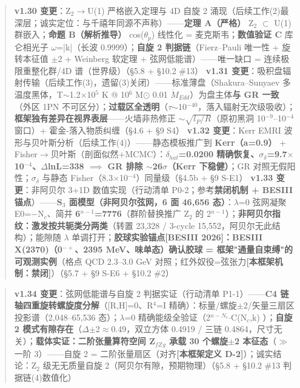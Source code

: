 \documentclass[UTF8,fontset=windows]{csoarticle}
\newcommand{\mtag}[1]{\textbf{[#1]}}
\newcommand{\up}[1]{\ensuremath{^{#1}}}
\newcommand{\down}[1]{\ensuremath{_{#1}}}
\begin{document}
\begin{quote}
\textbf{v1.30 变更}：Z\down{2}\ensuremath{\to}U(1) 严格嵌入定理与 4D 自旋 2 涌现（后续工作(2)最深层；诚实定位：与千禧年同源不声称）------\textbf{定理 A（严格）} Z\down{2} \ensuremath{\subset} U(1) 群嵌入；\textbf{命题 B（解析推导）} cos(\ensuremath{\theta}\down{p}) 线性化 = 麦克斯韦；\textbf{数值验证 C} 库仑相光子 \ensuremath{\omega}=|k|（长波 0.9999）；\textbf{自旋 2 判据链}（Fierz--Pauli 唯一性 + 旋转本征值 \ensuremath{\pm}2 + Weinberg 软定理 + 弦网低能谱）------唯一缺口 = 连续极限重整化群/4D 谱（世界级）（\S{}5.8 + \S{}10.2 \#13）
\textbf{v1.31 变更}：吸积盘辐射传输（后续工作(3)，遗留(3)关闭）------标准薄盘（Shakura--Sunyaev 多温度黑体，T\ensuremath{\sim}1.2\ensuremath{\times}10\up{5} K @ 10\up{6} M\ensuremath{\odot} 0.01 \ensuremath{\dot{M}}\down{Edd}）为盘主体\textbf{与 GR 一致}（外区 1PN 不可区分）；\textbf{过载区全透明}（\ensuremath{\tau}\ensuremath{\sim}10\up{-40}，落入辐射无次级吸收）；\textbf{框架独有差异在视界表层}------火墙非热修正 \ensuremath{\sim}\ensuremath{\sqrt{l\down{P}/R}}（原初黑洞 10\up{-9}--10\up{-4} 窗口）+ 霍金-落入物质纠缠（\S{}4.6 + \S{}9 S4）
\textbf{v1.32 变更}：Kerr EMRI 波形与贝叶斯分析（后续工作(4)）------静态模板推广到 \textbf{Kerr（a=0.9）} + Fisher\ensuremath{\to}贝叶斯（剖面似然+MCMC）：\textbf{\ensuremath{\delta}\down{hat}=0.0200 精确恢复、\ensuremath{\sigma}\down{\delta{}}=9.7\ensuremath{\times}10\up{-4}、\ensuremath{\Delta}lnL=338 \ensuremath{\implies} GR 排除 \ensuremath{\sim}26\ensuremath{\sigma}（Kerr 下稳健）}；GR 对照无假阳性；\ensuremath{\sigma}\down{\delta{}} 与静态 Fisher（8.3\ensuremath{\times}10\up{-4}）同量级（\S{}4.5b + \S{}9 S-E1）
\textbf{v1.33 变更}：非阿贝尔 3+1D 数值实现（行动清单 P0-2；参考\textbf{禁闭机制 + BESIII 锚点}）------\textbf{S\down{3} 面模型（非阿贝尔弦网，6 面 46,656 态）}：\ensuremath{\lambda}=0 弦网凝聚 E0=\ensuremath{-}N\down{c}、简并 \textbf{6\up{n-1}=7776}（群阶替换推广 Z\down{2} 的 2\up{n-1}）；\textbf{非阿贝尔指纹：激发按共轭类分两类}（转置 23,328 / 3-cycle 15,552，阿贝尔无此结构）；能隙随 \ensuremath{\lambda} 单调打开；\textbf{胶球实验锚点[BESIII 2026]：BESIII X(2370)（0\up{-+}、2395 MeV、味单态）确认胶球 = 框架"通量自束缚"的可观测实例}（格点 QCD 2.3--3.0 GeV 对照；红外奴役=弦张力\mtag{本框架机制：禁闭}）（\S{}5.7 + \S{}9 S-E6 + \S{}10.2 \#2）
\end{quote}

\begin{quote}
\textbf{v1.34 变更}：弦网低能谱与自旋 2 判据实证（行动清单 P1-1）------\textbf{C4 链轴四重旋转螺旋度分解}（[R,H]=0、R\up{4}=I 精确）：标量/螺旋\ensuremath{\pm}2/矢量三扇区投影谱（2,048--65,536 态）；\ensuremath{\lambda}=0 精确能级全验证（2\up{n-N\down{c}}\ensuremath{\cdot}C(N\down{c},k) \checkmark）；\textbf{自旋 2 模式有隙存在}（\ensuremath{\Delta}\ensuremath{\pm}2\ensuremath{\approx}0.49，双立方体 0.4919 / 三链 0.4864，尺寸无关）；\textbf{载体实证：二阶张量算符空间 Z\down{fZ}\down{g} 承载 30 个螺旋\ensuremath{\pm}2 本征态}（\ensuremath{\gg}一阶 3）------自旋 2 = 二阶张量扇区（对齐\mtag{本框架定义 D-2}）；诚实结论：Z\down{2} 级无无质量自旋 2（阿贝尔有隙，预期物理）（\S{}5.8 + \S{}10.2 \#13 判据链(4)数值化）
\end{quote}
\end{document}
